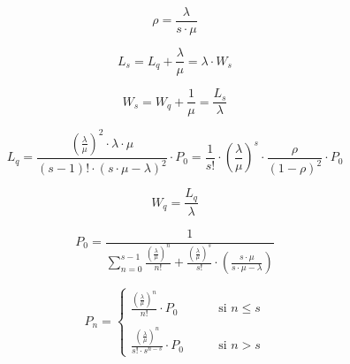 \documentclass{templateNote}
\newcommand{\newparagraph}{\par\vspace{\baselineskip}\noindent}
\begin{document}
\begin{tcolorbox}[
    colframe=black!100, %
    colback=white!100,       %
    coltitle=white!100, %
    title=\textbf{M/M/S} $\rho < 1$, %
]
\begin{minipage}{0.15\textwidth}
    \begin{equation*}
        \rho = \frac{\lambda}{s \cdot \mu}
    \end{equation*}
\end{minipage}
\hfill
\begin{minipage}{0.25\textwidth}
    \begin{equation*}
        L_s = L_q + \frac{\lambda}{\mu} = \lambda \cdot W_s
    \end{equation*}
\end{minipage}
\hfill
\begin{minipage}{0.4\textwidth}
    \begin{equation*}
        W_s = W_q + \frac{1}{\mu} = \frac{L_s}{\lambda}
    \end{equation*}
\end{minipage}
\newparagraph
\begin{minipage}{0.7\textwidth}
    \begin{equation*}
        L_q = \frac{\left(\displaystyle\frac{\lambda}{\mu}\right)^2 \cdot \lambda \cdot \mu}{(s-1)! \cdot (s \cdot \mu - \lambda)^2} \cdot P_0 = \frac{1}{s!} \cdot \left(\frac{\lambda}{\mu}\right)^s \cdot \frac{\rho}{(1-\rho)^2} \cdot P_0
    \end{equation*}
\end{minipage}
\hfill
\begin{minipage}{0.2\textwidth}
    \begin{equation*}
        W_q = \frac{L_q}{\lambda}
    \end{equation*}
\end{minipage}
\newparagraph
\begin{minipage}{0.5\textwidth}
    \begin{equation*}
        P_0 = \frac{1}{\displaystyle\sum_{n=0}^{s-1}{\frac{\left(\frac{\lambda}{\mu}\right)^n}{n!} + \frac{\left(\frac{\lambda}{\mu}\right)^s}{s!} \cdot \left(\frac{s \cdot \mu}{s \cdot \mu - \lambda}\right)}}
    \end{equation*}
\end{minipage}
\hfill
\begin{minipage}{0.45\textwidth}
    \begin{equation*}
        P_n = \begin{cases}
            \displaystyle\frac{\left(\frac{\lambda}{\mu}\right)^n}{n!} \cdot P_0 & \qquad \text{si } n \leq s \\
            \\
            \displaystyle\frac{\left(\frac{\lambda}{\mu}\right)^n}{s! \cdot s^{n-s}} \cdot P_0 & \qquad \text{si } n > s
        \end{cases}
    \end{equation*}
\end{minipage}
\end{tcolorbox}
\end{document}
